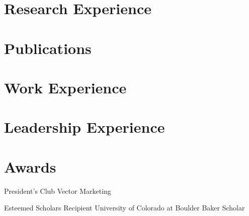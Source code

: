 \documentclass[11pt]{article} %
\begin{document}
\section{Research Experience}






\pagebreak[3]
\section{Publications}




\pagebreak[3]
\section{Work Experience}








\pagebreak[3]
\section{Leadership Experience}



\pagebreak[3]
\section{Awards}

    {}
    {President's Club}
    {Vector Marketing}
    {}

    {}
    {Esteemed Scholars Recipient}
    {University of Colorado at Boulder}
    {Baker Scholar}
        
\end{document}
